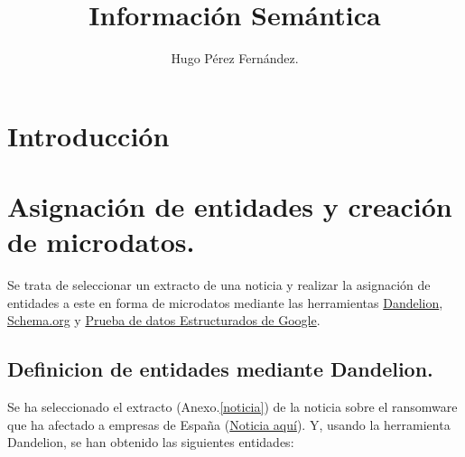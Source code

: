 \documentclass{llncs}   %
\begin{document}
\title{Información Semántica}

\author{Hugo Pérez Fernández.  
}
\maketitle              

\begin{abstract}

\end{abstract}

\section{Introducción}

\section{Asignación de entidades y creación de microdatos.}

Se trata de seleccionar un extracto de una noticia y realizar la asignación de entidades a este en forma de microdatos mediante las 
herramientas \href{https://dandelion.eu/semantic-text/entity-extraction-demo/}{Dandelion}, 
\href{https://schema.org/docs/schemas.html}{Schema.org} y 
\href{https://search.google.com/structured-data/testing-tool/u/0/}{Prueba de datos Estructurados de Google}.

\subsection{Definicion de entidades mediante Dandelion.}

Se ha seleccionado el extracto (Anexo.\ref{noticia}) de la noticia sobre el ransomware que 
ha afectado a empresas de España 
(\href{https://www.elconfidencial.com/tecnologia/2019-11-04/everis-la-ser-ciberataque-ransomware_2312019/}{Noticia aquí}).
Y, usando la herramienta Dandelion, 
se han obtenido las siguientes entidades:
\end{document}
